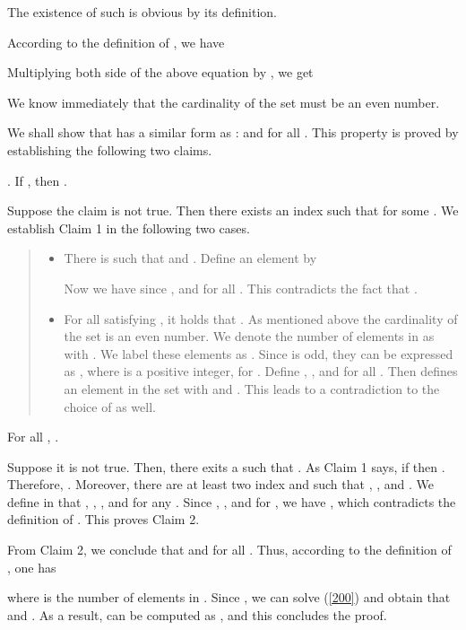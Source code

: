 \documentclass[a4paper, 11pt]{article}
\begin{document}
The existence of such  is obvious by its definition.

According to the definition of , we have

Multiplying  both side of the above equation by , we  get

We know immediately that the cardinality of the set  must be an  even number.

We shall show that  has a similar form as  :  and  for all .  This property is proved by establishing   the following two claims.

\medskip

. If , then .

\medskip
Suppose the claim is not true. Then there exists an index  such that  for some . We establish Claim 1 in the following  two cases.

\begin{quote}
\begin{itemize}
\item There is   such that  and . Define an element  by

Now we have  since  ,  and  for all .
This contradicts  the fact that .

\item  For all  satisfying , it holds that . As mentioned above the cardinality of the set  is an  even number. We denote the number of elements in  as  with . We label these elements as . Since  is odd, they can be expressed as , where  is a positive integer, for .
Define ,  , and  for all . Then  defines an element in the set  with  and . This leads to a contradiction to the choice of  as well.
\end{itemize}
\end{quote}
\medskip

  For all , .

\medskip

Suppose it is not true. Then, there exits a  such that . As Claim 1 says, if  then . Therefore, . Moreover, there are at least two index  and  such that , ,  and . We define  in that , ,  , and  for any .  Since , ,  and  for , we have , which contradicts the definition of . This proves Claim 2.

From Claim 2, we conclude that   and  for all . Thus, according to the definition of , one has

where  is the number of elements in .
Since , we can solve (\ref{200}) and obtain that  and . As a result,  can be computed as , and this concludes the proof.
\end{document}
